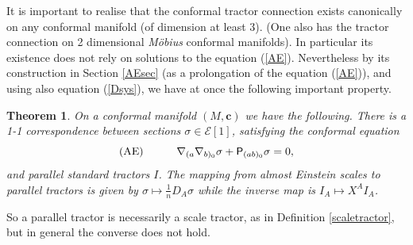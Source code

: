 \documentclass[a4paper,12pt]{amsart}
\def\Cal{\mathcal}
\newcommand{\V}{\mbox{\sf P}}
\newcommand{\cc}{\boldsymbol{c}}
\newcommand{\ce}{{\Cal E}}
\newcommand{\si}{\sigma}
\newtheorem{theorem}{Theorem}[section]
\theoremstyle{remark}
\newcommand{\nn}[1]{(\ref{#1})}
\begin{document}
It is important to realise that the conformal tractor connection
exists canonically on any conformal manifold (of dimension at least
3). (One also has the tractor connection on 2 dimensional \emph{M\"obius} conformal manifolds). In particular its existence does not rely on solutions to the equation \nn{AE}.  Nevertheless by its construction in
Section \ref{AEsec} (as a prolongation of the equation \nn{AE}), and
using also equation \nn{Dsys}, we have at once the following important
property. 
\begin{theorem} \label{para}
On a conformal manifold $(M,\cc)$  we have the following. 
There is a 1-1 correspondence
between sections $\si\in \ce[1]$, satisfying the conformal equation
$$ \mbox{\rm (AE)} \quad \quad \quad
\nabla_{(a}\nabla_{b)_0}\sigma+\V_{(ab)_0}\sigma=0,
$$ 
and parallel standard tractors $I$.
The mapping from
almost Einstein scales to parallel tractors is given by $\si\mapsto
\frac{1}{n}D_A \si$ while the inverse map is $I_A \mapsto X^A I_A$.
\end{theorem}
\noindent So a parallel tractor is necessarily a scale tractor, as in
Definition \ref{scaletractor}, but in general the converse does not hold.

 
\end{document}
